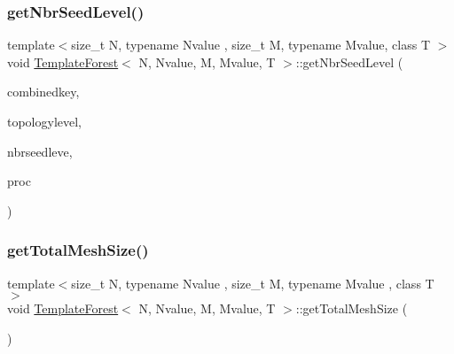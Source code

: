\mbox{\label{classTemplateForest_afe03a79ad5dbcbce96df1f7bdcac7e66}} 
\subsubsection{\texorpdfstring{get\+Nbr\+Seed\+Level()}{getNbrSeedLevel()}\hspace{0.1cm}{\footnotesize\ttfamily [2/2]}}
{\footnotesize\ttfamily template$<$size\+\_\+t N, typename Nvalue , size\+\_\+t M, typename Mvalue, class T $>$ \\
void \mbox{\hyperlink{classTemplateForest}{Template\+Forest}}$<$ N, Nvalue, M, Mvalue, T $>$\+::get\+Nbr\+Seed\+Level (\begin{DoxyParamCaption}\item[{\mbox{\hyperlink{definitions_8h_af8682350bd8bb38ee9023f7a0a310add}{morton}}$<$ N+M $>$ \&}]{combinedkey,  }\item[{\mbox{\hyperlink{definitions_8h_a69aa29b598b851b0640aa225a9e5d61d}{uint}}}]{topologylevel,  }\item[{\mbox{\hyperlink{definitions_8h_a69aa29b598b851b0640aa225a9e5d61d}{uint}} $\ast$}]{nbrseedleve,  }\item[{\mbox{\hyperlink{classFullTree}{Full\+Tree}}$<$ M, Mvalue $>$ \&}]{proc }\end{DoxyParamCaption})}

\mbox{\label{classTemplateForest_a77c9dba6818f98a45bcb10db4f8c7455}} 
\subsubsection{\texorpdfstring{get\+Total\+Mesh\+Size()}{getTotalMeshSize()}}
{\footnotesize\ttfamily template$<$size\+\_\+t N, typename Nvalue , size\+\_\+t M, typename Mvalue , class T $>$ \\
void \mbox{\hyperlink{classTemplateForest}{Template\+Forest}}$<$ N, Nvalue, M, Mvalue, T $>$\+::get\+Total\+Mesh\+Size (\begin{DoxyParamCaption}{ }\end{DoxyParamCaption})}

